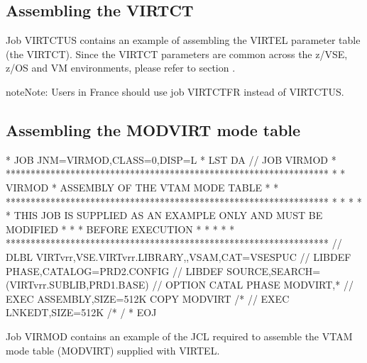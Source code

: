 \documentclass[letterpaper,10pt,english]{sphinxmanual}
\begin{document}
\subsection{Assembling the VIRTCT}
\label{\detokenize{Installation_Guide:assembling-the-virtct}}
Job VIRTCTUS contains an example of assembling the VIRTEL parameter table (the VIRTCT). Since the VIRTCT parameters are common across the z/VSE, z/OS and VM environments, please refer to section {\hyperref[\detokenize{Installation_Guide:vvrrig-virtct}]{}}.

\begin{sphinxadmonition}{note}{Note:}
Users in France should use job VIRTCTFR instead of VIRTCTUS.
\end{sphinxadmonition}


\subsection{Assembling the MODVIRT mode table}
\label{\detokenize{Installation_Guide:assembling-the-modvirt-mode-table}}
\begin{sphinxVerbatim}[commandchars=\\\{\}]
* \PYGZdl{}\PYGZdl{} JOB JNM=VIRMOD,CLASS=0,DISP=L
* \PYGZdl{}\PYGZdl{} LST DA
// JOB VIRMOD
* *****************************************************************
* * VIRMOD * ASSEMBLY OF THE VTAM MODE TABLE *
* *****************************************************************
* * *
* * THIS JOB IS SUPPLIED AS AN EXAMPLE ONLY AND MUST BE MODIFIED *
* * BEFORE EXECUTION *
* * *
* *****************************************************************
// DLBL VIRTvrr,\PYGZsq{}VSE.VIRTvrr.LIBRARY\PYGZsq{},,VSAM,CAT=VSESPUC
// LIBDEF PHASE,CATALOG=PRD2.CONFIG
// LIBDEF SOURCE,SEARCH=(VIRTvrr.SUBLIB,PRD1.BASE)
// OPTION CATAL
  PHASE MODVIRT,*
// EXEC ASSEMBLY,SIZE=512K
  COPY MODVIRT
/*
// EXEC LNKEDT,SIZE=512K
/*
/\PYGZam{}
* \PYGZdl{}\PYGZdl{} EOJ
\end{sphinxVerbatim}


Job VIRMOD contains an example of the JCL required to assemble the VTAM mode table (MODVIRT) supplied with VIRTEL.
\end{document}

